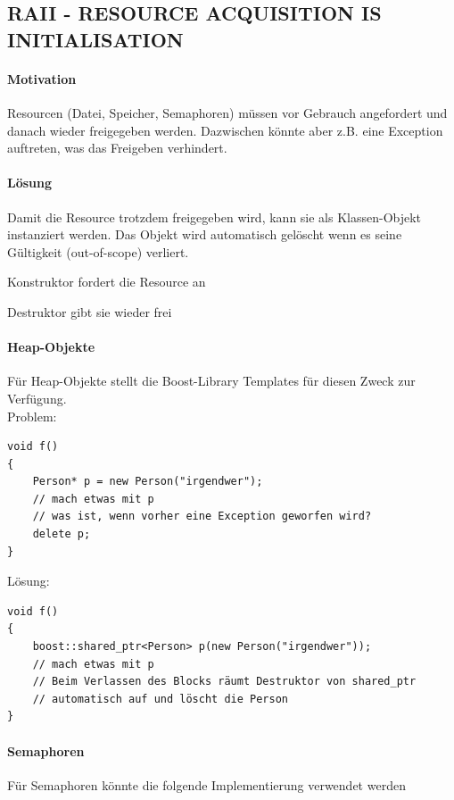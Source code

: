 


\subsection[RAII]{RAII - RESOURCE ACQUISITION IS INITIALISATION}

\paragraph{Motivation}
Resourcen (Datei, Speicher, Semaphoren) müssen vor Gebrauch angefordert und danach wieder freigegeben werden.
Dazwischen könnte aber z.B. eine Exception auftreten, was das Freigeben verhindert.

\paragraph{Lösung}
Damit die Resource trotzdem freigegeben wird, kann sie als Klassen-Objekt instanziert werden. Das Objekt wird automatisch gelöscht wenn es seine Gültigkeit (out-of-scope) verliert.
\begin{compactitem}
	\item Konstruktor fordert die Resource an
	\item Destruktor gibt sie wieder frei
\end{compactitem}


\paragraph{Heap-Objekte}
Für Heap-Objekte stellt die Boost-Library Templates für diesen Zweck zur Verfügung.\\
Problem:
\begin{lstlisting}
void f()
{
	Person* p = new Person("irgendwer");
	// mach etwas mit p
	// was ist, wenn vorher eine Exception geworfen wird?
	delete p;
}
\end{lstlisting}

Lösung:
\begin{lstlisting}
void f()
{
	boost::shared_ptr<Person> p(new Person("irgendwer"));
	// mach etwas mit p
	// Beim Verlassen des Blocks räumt Destruktor von shared_ptr
	// automatisch auf und löscht die Person
}
\end{lstlisting}


\paragraph{Semaphoren} Für Semaphoren könnte die folgende Implementierung verwendet werden


